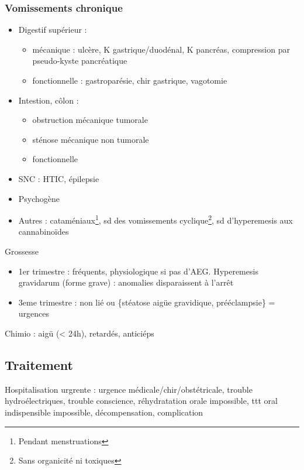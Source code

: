 \documentclass[11pt]{article}
\begin{document}
\subsubsection{Vomissements chronique}
\label{sec:orgc1dae74}
\begin{itemize}
\item Digestif supérieur : 
\begin{itemize}
\item mécanique : ulcère, K gastrique/duodénal, K pancréas, compression par
pseudo-kyste pancréatique
\item fonctionnelle : gastroparésie, chir gastrique, vagotomie
\end{itemize}
\item Intestion, côlon :
\begin{itemize}
\item obstruction mécanique tumorale
\item sténose mécanique non tumorale
\item fonctionnelle
\end{itemize}
\item SNC : HTIC, épilepsie
\item Psychogène
\item Autres : cataméniaux\footnote{Pendant menstruations}, sd des vomissements cyclique\footnote{Sans organicité ni toxiques}, sd d'hyperemesis aux cannabinoïdes
\end{itemize}
Grossesse
\begin{itemize}
\item 1er trimestre : fréquents, physiologique si pas d'AEG. Hyperemesis gravidarum
(forme grave) : anomalies disparaissent à l'arrêt
\item 3eme trimestre : non lié ou \{stéatose aigüe gravidique, prééclampsie\} =
urgences 
\end{itemize}
Chimio : aigü (< 24h), retardés, anticiéps

\subsection{Traitement}
\label{sec:org1611ee8}
Hospitalisation urgrente : urgence médicale/chir/obstétricale, trouble
hydroélectriques, trouble conscience, réhydratation orale impossible, ttt oral
indispensible impossible, décompensation, complication
\end{document}

